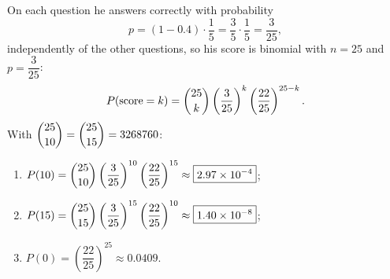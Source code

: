 On each question he answers correctly with probability
\[p=(1-0.4)\cdot\dfrac15=\dfrac35\cdot\dfrac15=\dfrac{3}{25},\]
independently of the other questions, so his score is binomial with $n=25$ and $p=\dfrac3{25}$:
\[P(\text{score}=k)=\dbinom{25}{k}\left(\dfrac{3}{25}\right)^k\left(\dfrac{22}{25}\right)^{25-k}.\]
With $\dbinom{25}{10}=\dbinom{25}{15}=3268760$:
\begin{enumerate}
\item[(a)] $P(10)=\dbinom{25}{10}\left(\dfrac{3}{25}\right)^{10}\left(\dfrac{22}{25}\right)^{15}\approx\boxed{2.97\times10^{-4}}$;
\item[(b)] $P(15)=\dbinom{25}{15}\left(\dfrac{3}{25}\right)^{15}\left(\dfrac{22}{25}\right)^{10}\approx\boxed{1.40\times10^{-8}}$;
\item[(c)] $P(0)=\left(\dfrac{22}{25}\right)^{25}\approx\boxed{0.0409}$.
\end{enumerate}
